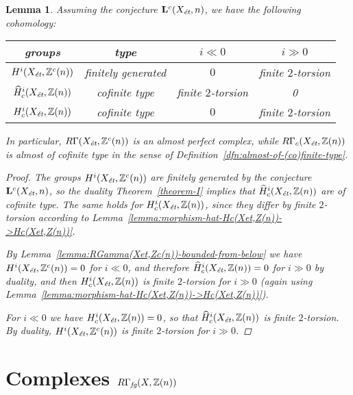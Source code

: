 \documentclass{article}
\newcommand{\ZZ}{\mathbb{Z}}
\newcommand{\et}{\text{\it ét}}
\newcommand{\fg}{\text{\it fg}}
\newtheorem{lemma}[theorem]{Lemma}
\theoremstyle{definition}
\numberwithin{equation}{section}
\begin{document}
\begin{lemma}
  \label{lemma:RGammac(Xet,Z(n))-almost-cofinite-type}
  Assuming the conjecture $\mathbf{L}^c (X_\et,n)$, we have the following
  cohomology:
  \begin{center}
    \renewcommand{\arraystretch}{1.5}
    \begin{tabular}{cccc}
      \hline
      \textbf{groups} & \textbf{type} & $i \ll 0$ & $i \gg 0$ \\
      \hline
      $H^i (X_\et, \ZZ^c (n))$ & finitely generated & $0$ & finite $2$-torsion \\
      $\widehat{H}^i_c (X_\et, \ZZ (n))$ & cofinite type & finite $2$-torsion & 0 \\
      $H^i_c (X_\et, \ZZ (n))$ & cofinite type & $0$ & finite $2$-torsion \\
      \hline
    \end{tabular}
  \end{center}
  In particular, $R\Gamma (X_\et, \ZZ^c (n))$ is an almost perfect complex,
  while $R\Gamma_c (X_\et, \ZZ (n))$ is almost of cofinite type in the sense of
  Definition~\ref{dfn:almost-of-(co)finite-type}.

  \begin{proof}
    The groups $H^i (X_\et, \ZZ^c (n))$ are finitely generated by the conjecture
    $\mathbf{L}^c (X_\et,n)$, so the duality Theorem~\ref{theorem-I} implies that
    $\widehat{H}^i_c (X_\et, \ZZ (n))$ are of cofinite type. The same holds for
    $H^i_c (X_\et, \ZZ(n))$, since they differ by finite $2$-torsion according to
    Lemma~\ref{lemma:morphism-hat-Hc(Xet,Z(n))->Hc(Xet,Z(n))}.

    By Lemma~\ref{lemma:RGamma(Xet,Zc(n))-bounded-from-below} we have
    $H^i (X_\et, \ZZ^c (n)) = 0$ for $i \ll 0$, and therefore
    $\widehat{H}^i_c (X_\et, \ZZ (n)) = 0$ for $i \gg 0$ by duality,
    and then $H^i_c (X_\et, \ZZ (n))$ is finite $2$-torsion for $i \gg 0$
    (again using Lemma~\ref{lemma:morphism-hat-Hc(Xet,Z(n))->Hc(Xet,Z(n))}).

    For $i \ll 0$ we have $H^i_c (X_\et, \ZZ (n)) = 0$, so that
    $\widehat{H}^i_c (X_\et, \ZZ (n))$ is finite $2$-torsion. By duality,
    $H^i (X_\et, \ZZ^c (n))$ is finite $2$-torsion for $i \gg 0$.
  \end{proof}
\end{lemma}


\section{Complexes $R\Gamma_\fg (X, \ZZ(n))$}
\label{sec:RGamma-fg}
\end{document}
